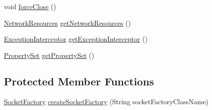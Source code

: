\begin{DoxyCompactItemize}
\item 
void \mbox{\hyperlink{classcom_1_1mysql_1_1cj_1_1protocol_1_1_abstract_socket_connection_a1c207a3f49d387dec92de48fc141de65}{force\+Close}} ()
\item 
\mbox{\hyperlink{classcom_1_1mysql_1_1cj_1_1protocol_1_1_network_resources}{Network\+Resources}} \mbox{\hyperlink{classcom_1_1mysql_1_1cj_1_1protocol_1_1_abstract_socket_connection_a4352de9fb88c8ee51a26347fb3d680ec}{get\+Network\+Resources}} ()
\item 
\mbox{\hyperlink{interfacecom_1_1mysql_1_1cj_1_1exceptions_1_1_exception_interceptor}{Exception\+Interceptor}} \mbox{\hyperlink{classcom_1_1mysql_1_1cj_1_1protocol_1_1_abstract_socket_connection_aa8c3a29041cab7f202c842e456104a5b}{get\+Exception\+Interceptor}} ()
\item 
\mbox{\hyperlink{interfacecom_1_1mysql_1_1cj_1_1conf_1_1_property_set}{Property\+Set}} \mbox{\hyperlink{classcom_1_1mysql_1_1cj_1_1protocol_1_1_abstract_socket_connection_a348b688bc6dc34862651adaf6b2f057f}{get\+Property\+Set}} ()
\end{DoxyCompactItemize}
\subsection*{Protected Member Functions}
\begin{DoxyCompactItemize}
\item 
\mbox{\hyperlink{interfacecom_1_1mysql_1_1cj_1_1protocol_1_1_socket_factory}{Socket\+Factory}} \mbox{\hyperlink{classcom_1_1mysql_1_1cj_1_1protocol_1_1_abstract_socket_connection_adeac7abffbd9deac0a2ab724e803ed91}{create\+Socket\+Factory}} (String socket\+Factory\+Class\+Name)
\end{DoxyCompactItemize}
